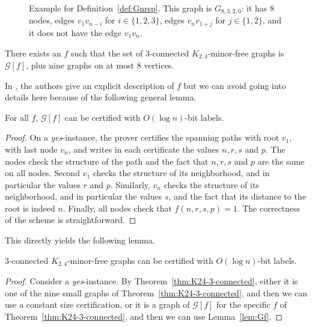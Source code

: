 \documentclass[a4paper,thm-restate,USenglish]{lipics-v2019}
\begin{document}
\begin{figure}[!h]
    \centering
    
    \caption{Example for Definition~\ref{def:Gnrsp}. This graph is $G_{8,3,2,0}$: it has 8 nodes, edges $v_1v_{n-i}$ for $i\in \{1,2,3\}$, edges $v_nv_{1+j}$ for $j \in \{1,2\}$, and it does not have the edge $v_1v_n$.}
    \label{fig:Gnrsp}
\end{figure}

\begin{theorem}\label{thm:K24-3-connected}
There exists an $f$ such that the set of 3-connected $K_{2,4}$-minor-free graphs is $\mathcal{G}[f]$, plus nine graphs on at most 8 vertices.
\end{theorem}

In \cite{EllinghamMOT16}, the authors give an explicit description of $f$  but we can avoid going into details here because of the following general lemma. 

\begin{lemma}\label{lem:Gf}
For all $f$, $\mathcal{G}[f]$ can be certified with $O(\log n)$-bit labels.
\end{lemma}

\begin{proof}
On a \emph{yes}-instance, the prover certifies the spanning paths with root $v_1$, with last node $v_n$, and writes in each certificate the values $n,r,s$ and $p$.
The nodes check the structure of the path and the fact that $n,r,s$ and $p$ are the same on all nodes. Second $v_1$ checks the structure of its neighborhood, and in particular the values $r$ and $p$. Similarly, $v_n$ checks  the structure of its neighborhood, and in particular the values $s$, and the fact that its distance to the root is indeed $n$. Finally, all nodes check that $f(n,r,s,p)=1$.
The correctness of the scheme is straightforward.
\end{proof}

This directly yields the following lemma.
\begin{lemma}\label{lem:3-connected-K24}
3-connected $K_{2,4}$-minor-free graphs can be certified with $O(\log n)$-bit labels.
\end{lemma}

\begin{proof}
Consider a \emph{yes}-instance. By Theorem~\ref{thm:K24-3-connected}, either it is one of the nine small graphs of Theorem~\ref{thm:K24-3-connected}, and then we can use a constant size certification, or it is a graph of $\mathcal{G}[f]$ for the specific $f$ of Theorem~\ref{thm:K24-3-connected}, and then we can use Lemma~\ref{lem:Gf}.
\end{proof}
\end{document}

